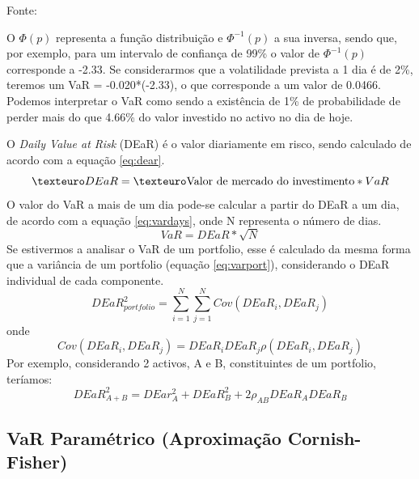\documentclass[
  12pt,
  a4paper,
  openany]{book}
\begin{document}
Fonte: \citep[pp.13]{phdthesis}

\justifying
\bigskip

O \(\Phi (p)\) representa a função distribuição e \(\Phi^{-1} (p)\) a sua inversa, sendo que, por exemplo, para um intervalo de confiança de 99\% o valor de \(\Phi^{-1} (p)\) corresponde a -2.33. Se considerarmos que a volatilidade prevista a 1 dia é de 2\%, teremos um VaR = -0.020*(-2.33), o que corresponde a um valor de 0.0466. Podemos interpretar o VaR como sendo a existência de 1\% de probabilidade de perder mais do que 4.66\% do valor investido no activo no dia de hoje.

O \emph{Daily Value at Risk} (DEaR) é o valor diariamente em risco, sendo calculado de acordo com a equação \eqref{eq:dear}.
\begin{equation} 
  €DEaR = € \textnormal{Valor de mercado do investimento} * VaR
  \label{eq:dear}  
\end{equation}
O valor do VaR a mais de um dia pode-se calcular a partir do DEaR a um dia, de acordo com a equação \eqref{eq:vardays}, onde N representa o número de dias.
\begin{equation} 
  VaR = DEaR*\sqrt{N}
  \label{eq:vardays}
\end{equation}
Se estivermos a analisar o VaR de um portfolio, esse é calculado da mesma forma que a variância de um portfolio (equação \eqref{eq:varport}), considerando o DEaR individual de cada componente.
\begin{equation} 
  DEaR_{portfolio}^{2} = \sum_{i=1}^{N}\sum_{j=1}^{N}Cov(DEaR_i,DEaR_j)
  \label{eq:varport}
\end{equation}
onde
\begin{equation} 
  Cov(DEaR_i,DEaR_j) = DEaR_{i}DEaR_{j}\rho(DEaR_i,DEaR_j)
  \label{eq:covport}
\end{equation}
Por exemplo, considerando 2 activos, A e B, constituintes de um portfolio, teríamos:
\begin{equation} 
  DEaR_{A+B}^{2} = DEar_{A}^{2}+DEaR_{B}^{2}+2\rho_{AB} DEaR_{A} DEaR_B
  \label{eq:ab}
\end{equation}

\hypertarget{var-paramuxe9trico-aproximauxe7uxe3o-cornish-fisher}{%
\subsection{VaR Paramétrico (Aproximação Cornish-Fisher)}\label{var-paramuxe9trico-aproximauxe7uxe3o-cornish-fisher}}
\end{document}

